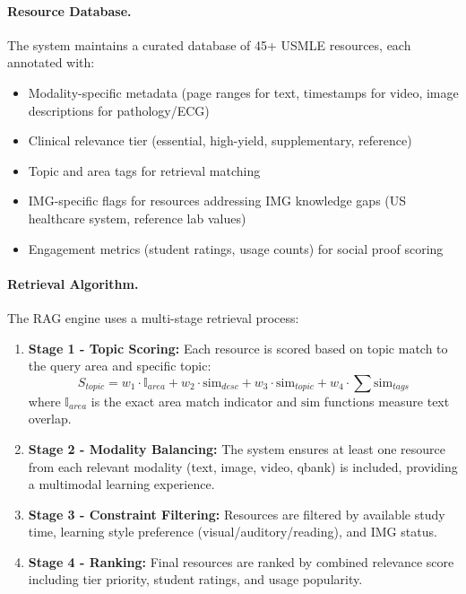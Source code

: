 \paragraph{Resource Database.}
The system maintains a curated database of 45+ USMLE resources, each annotated with:
\begin{itemize}
    \item Modality-specific metadata (page ranges for text, timestamps for video, image descriptions for pathology/ECG)
    \item Clinical relevance tier (essential, high-yield, supplementary, reference)
    \item Topic and area tags for retrieval matching
    \item IMG-specific flags for resources addressing IMG knowledge gaps (US healthcare system, reference lab values)
    \item Engagement metrics (student ratings, usage counts) for social proof scoring
\end{itemize}

\paragraph{Retrieval Algorithm.}
The RAG engine uses a multi-stage retrieval process:

\begin{enumerate}
    \item \textbf{Stage 1 - Topic Scoring:} Each resource is scored based on topic match to the query area and specific topic:
    \begin{equation}
    S_{topic} = w_1 \cdot \mathbb{I}_{area} + w_2 \cdot \text{sim}_{desc} + w_3 \cdot \text{sim}_{topic} + w_4 \cdot \sum \text{sim}_{tags}
    \end{equation}
    where $\mathbb{I}_{area}$ is the exact area match indicator and $\text{sim}$ functions measure text overlap.
    
    \item \textbf{Stage 2 - Modality Balancing:} The system ensures at least one resource from each relevant modality (text, image, video, qbank) is included, providing a multimodal learning experience.
    
    \item \textbf{Stage 3 - Constraint Filtering:} Resources are filtered by available study time, learning style preference (visual/auditory/reading), and IMG status.
    
    \item \textbf{Stage 4 - Ranking:} Final resources are ranked by combined relevance score including tier priority, student ratings, and usage popularity.
\end{enumerate}

